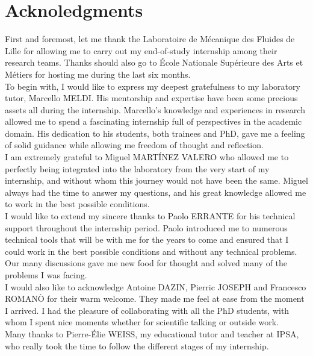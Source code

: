 \documentclass[12pt,twoside]{report}
\begin{document}
\clearpage

\chapter*{Acknoledgments}
\thispagestyle{empty}

First and foremost, let me thank the Laboratoire de Mécanique des Fluides de Lille for allowing me to carry out my end-of-study internship among their research teams. Thanks should also go to École Nationale Supérieure des Arts et Métiers for hosting me during the last six months. \\

To begin with, I would like to express my deepest gratefulness to my laboratory tutor, Marcello MELDI. His mentorship and expertise have been some precious assets all during the internship. Marcello's  knowledge and experiences in research allowed me to spend a fascinating internship full of perspectives in the academic domain. His dedication to his students, both trainees and PhD, gave me a feeling of solid guidance while allowing me freedom of thought and reflection. \\

I am extremely grateful to Miguel MARTÍNEZ VALERO who allowed me to perfectly being integrated into the laboratory from the very start of my internship, and without whom this journey would not have been the same. Miguel always had the time to answer my questions, and his great knowledge allowed me to work in the best possible conditions. \\

I would like to extend my sincere thanks to Paolo ERRANTE for his technical support throughout the internship period. Paolo introduced me to numerous technical tools that will be with me for the years to come and ensured that I could work in the best possible conditions and without any technical problems. Our many discussions gave me new food for thought and solved many of the problems I was facing. \\

I would also like to acknowledge Antoine DAZIN, Pierric JOSEPH and Francesco ROMANÒ for their warm welcome. They made me feel at ease from the moment I arrived. I had the pleasure of collaborating with all the PhD students, with whom I spent nice moments whether for scientific talking or outside work. \\

Many thanks to Pierre-Élie WEISS, my educational tutor and teacher at IPSA, who really took the time to follow the different stages of my internship. \\
\end{document}
